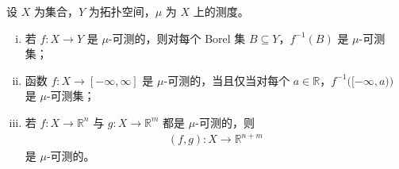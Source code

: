 \documentclass[../../main.tex]{subfiles}
\begin{document}
\begin{theorem}[原像]\label{theorem:ch01-1-10}
设 $X$ 为集合，$Y$ 为拓扑空间，$\mu$ 为 $X$ 上的测度。
\begin{enumerate}[(i)]
\item 若 $f:X\to Y$ 是 $\mu$-可测的，则对每个 Borel 集 $B\subseteq Y$，$f^{-1}(B)$ 是 $\mu$-可测集；
\item 函数 $f:X\to[-\infty,\infty]$ 是 $\mu$-可测的，当且仅当对每个 $a\in\mathbb{R}$，$f^{-1}\bigl([-\infty,a)\bigr)$ 是 $\mu$-可测集；
\item 若 $f:X\to\mathbb{R}^{n}$ 与 $g:X\to\mathbb{R}^{m}$ 都是 $\mu$-可测的，则
\begin{align*}
(f,g):X\to\mathbb{R}^{n+m}
\end{align*}
是 $\mu$-可测的。
\end{enumerate}
\end{theorem}
\end{document}
